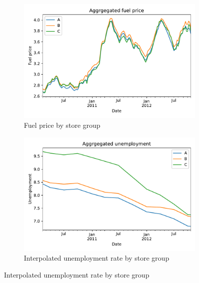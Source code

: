 \documentclass[english, 12pt, a4paper, sci, utf8, a-1b, online]{aaltothesis}
\begin{document}
\begin{figure}
	\begin{subfigure}[b]{0.5\textwidth}
		\centering
		\includegraphics[width=\textwidth]{../plots/dataset/dataset_plot_fuel_price.pdf}
		\caption{Fuel price by store group}
		\label{fig:data_fuel}
	\end{subfigure}
	\hfill
	\begin{subfigure}[b]{0.5\textwidth}
		\centering
		\includegraphics[width=\textwidth]{../plots/dataset/dataset_plot_unemployment_interpolated.pdf}
		\caption{Interpolated unemployment rate by store group}
		\label{fig:data_unemp}
	\end{subfigure}
\end{figure}
\end{document}
